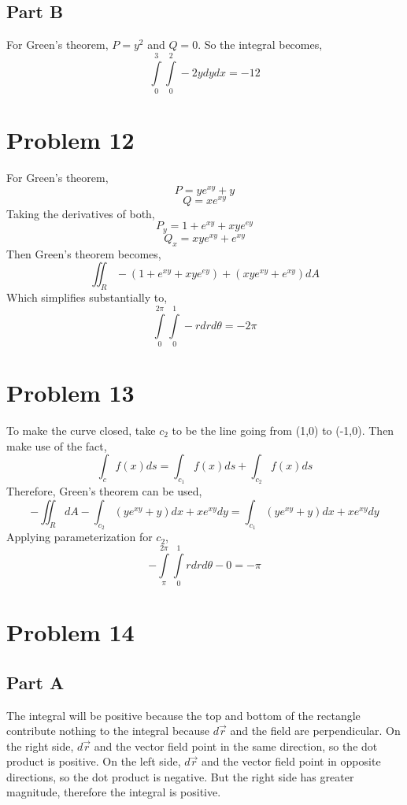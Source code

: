 \documentclass{article}
\begin{document}
\subsection*{Part B}

For Green's theorem, $P = y^2$ and $Q = 0$. So the integral becomes,
$$ \int\limits_0^3\int\limits_0^2 -2 y dy dx = -12 $$

\section*{Problem 12}

For Green's theorem,
$$ P = y e^{xy} + y $$
$$ Q = x e^{xy} $$
Taking the derivatives of both,
$$ P_y = 1 + e^{xy} + xy e^{ey} $$
$$ Q_x = xy e^{xy} + e^{xy} $$
Then Green's theorem becomes,
$$\iint_R -(1 + e^{xy} + xy e^{ey}) + (xy e^{xy} + e^{xy}) dA $$
Which simplifies substantially to,
$$ \int\limits_0^{2\pi}\int\limits_0^1 -r dr d\theta  = -2\pi $$

\section*{Problem 13}

To make the curve closed, take $c_2$ to be the line going from (1,0) to (-1,0).
Then make use of the fact,
$$ \int_c f(x) ds = \int_{c_1} f(x) ds + \int_{c_2} f(x) ds $$
Therefore, Green's theorem can be used,
$$ -\iint_R dA - \int_{c_2} (y e^{xy} + y)dx + x e^{xy} dy = \int_{c_1} (y
e^{xy} + y)dx + x e^{xy} dy$$
Applying parameterization for $c_2$,
$$ -\int\limits_{\pi}^{2\pi}\int\limits_0^1 r dr d\theta - 0 = -\pi $$

\section*{Problem 14}

\subsection*{Part A}

The integral will be positive because the top and bottom of the rectangle
contribute nothing to the integral because $d\vec{r}$ and the field are
perpendicular. On the right side, $d\vec{r}$ and the vector field point in the
same direction, so the dot product is positive. On the left side, $d\vec{r}$ and
the vector field point in opposite directions, so the dot product is negative.
But the right side has greater magnitude, therefore the integral is positive.
\end{document}
